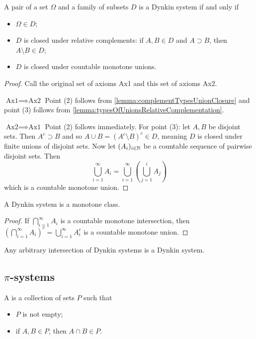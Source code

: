 \begin{lemma}
A pair of a set $\Omega$ and a family of subsets $D$ is a Dynkin system \textup{if and only if}
\begin{itemize}
\item $\Omega\in D$;
\item $D$ is closed under relative complements: if $A,B\in D$ and $A\supset B$, then $A\setminus B\in D$;
\item $D$ is closed under countable monotone unions.
\end{itemize}
\end{lemma}
\begin{proof}
Call the original set of axioms Ax1 and this set of axioms Ax2.

$\boxed{\text{Ax1}\implies\text{Ax2}}$ Point (2) follows from \ref{lemma:complementTypesUnionClosure} and point (3) follows from \ref{lemma:typesOfUnionsRelativeComplementation}.

$\boxed{\text{Ax2}\implies\text{Ax1}}$ Point (2) follows immediately. For point (3): let $A,B$ be disjoint sets. Then $A^c \supset B$ and so $A\cup B = (A^c\setminus B)^c \in D$, meaning $D$ is closed under finite unions of disjoint sets. Now let $(A_i)_{i\in\mathbb{N}}$ be a countable sequence of pairwise disjoint sets. Then
\[ \bigcup_{i=1}^\infty A_i = \bigcup_{i=1}^\infty \left(\bigcup_{j=1}^i A_j\right) \]
which is a countable monotone union.
\end{proof}

\begin{lemma}
A Dynkin system is a monotone class.
\end{lemma}
\begin{proof}
If $\bigcap_{i=1}^\infty A_i$ is a countable monotone intersection, then $\left(\bigcap_{i=1}^\infty A_i\right)^c = \bigcup_{i=1}^\infty A_i^c$ is a countable monotone union.
\end{proof}
\begin{lemma}
Any arbitrary intersection of Dynkin systems is a Dynkin system.
\end{lemma}

\subsection{$\pi$-systems}
\begin{definition}
A  is a collection of sets $P$ such that
\begin{itemize}
\item $P$ is not empty;
\item if $A,B\in P$, then $A\cap B\in P$.
\end{itemize}
\end{definition}

